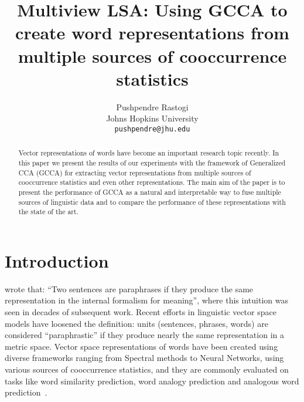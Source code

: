 \documentclass[11pt]{article}
\title{Multiview LSA: Using GCCA to create word
  representations from multiple sources of cooccurrence statistics}
\author{Pushpendre Rastogi \\
  Johns Hopkins University \\
  {\tt pushpendre@jhu.edu} 
}
\date{}
\begin{document}
\maketitle
\begin{abstract}
  Vector representations of words have become an
  important research topic recently. In this paper we present the
  results of our experiments with
  the framework of Generalized CCA (GCCA) for extracting vector
  representations from multiple sources of cooccurrence statistics and
  even other representations. 
  The main aim of the paper is to present the performance of GCCA as a
  natural and interpretable way to fuse multiple sources of linguistic
  data and to compare the performance of these representations with
  the state of the art.
\end{abstract}

\section{Introduction}
\cite{winograd1972understanding} wrote that: ``Two sentences are paraphrases if they
produce the same representation in the internal formalism for
meaning'', where this intuition was seen in decades of subsequent work.
Recent efforts in linguistic vector space models have loosened the
definition: units (sentences, phrases, words) are considered
``paraphrastic'' if they produce nearly the same representation in a
metric space.
Vector space representations of words have been created using diverse
 frameworks ranging from Spectral methods to Neural Networks, using various sources of
 cooccurrence statistics, and they are commonly evaluated on tasks
 like word similarity prediction, word analogy prediction and
 analogous word
 prediction~\cite{dhillon2011multi,dhillon2012two,mikolov2013efficient,mikolov2013distributed,collobert2013word,zou2013bilingual,faruqui2014improving,pennington2014glove,bansal2014tailoring,levy2014dependency,felix2014learning}.
\end{document}
